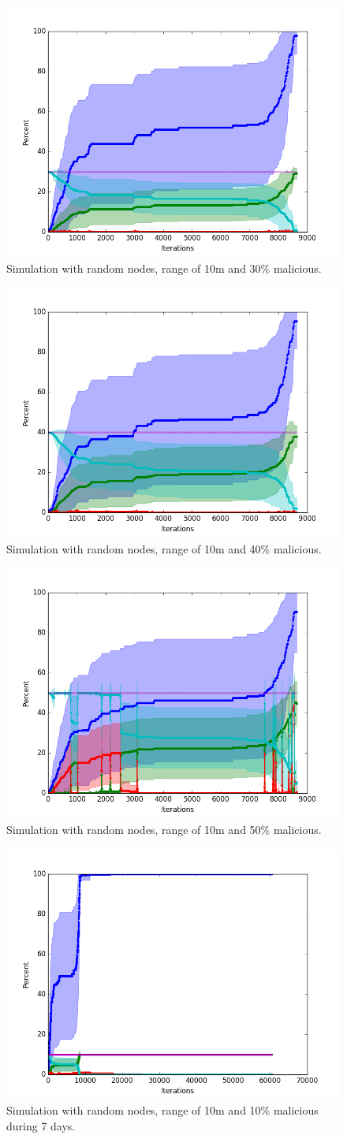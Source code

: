 \documentclass[conference]{IEEEtran}
\begin{document}
\begin{figure}
\centering
\includegraphics[width=0.5\linewidth]{Network_rA/10_30}
\caption{Simulation with random nodes, range of 10m and 30\% malicious.} \label{fig:random4}
\end{figure}

\begin{figure}
\centering
\includegraphics[width=0.5\linewidth]{Network_rA/10_40}
\caption{Simulation with random nodes, range of 10m and 40\% malicious.} \label{fig:random5}
\end{figure}

\begin{figure}
\centering
\includegraphics[width=0.5\linewidth]{Network_rA/10_50}
\caption{Simulation with random nodes, range of 10m and 50\% malicious.} \label{fig:random6}
\end{figure}


\begin{figure}
\centering
\includegraphics[width=0.5\linewidth]{Network_rA7/10_10}
\caption{Simulation with random nodes, range of 10m and 10\% malicious during 7 days.} \label{fig:random7}
\end{figure}
\end{document}
